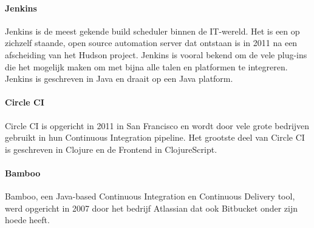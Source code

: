             
            \paragraph{Jenkins}
            Jenkins is de meest gekende build scheduler binnen de IT-wereld. Het is een op zichzelf staande, open source automation server dat ontstaan is in 2011 na een afscheiding van het Hudson project. Jenkins is vooral bekend om de vele plug-ins die het mogelijk maken om met bijna alle talen en platformen te integreren. Jenkins is geschreven in Java en draait op een Java platform.
            
            
            \paragraph{Circle CI}
            Circle CI is opgericht in 2011 in San Francisco en wordt door vele grote bedrijven gebruikt in hun Continuous Integration pipeline. Het grootste deel van Circle CI is geschreven in Clojure en de Frontend in ClojureScript. 

            \paragraph{Bamboo}
            Bamboo, een Java-based Continuous Integration en Continuous Delivery tool, werd opgericht in 2007 door het bedrijf Atlassian dat ook Bitbucket onder zijn hoede heeft.
            
